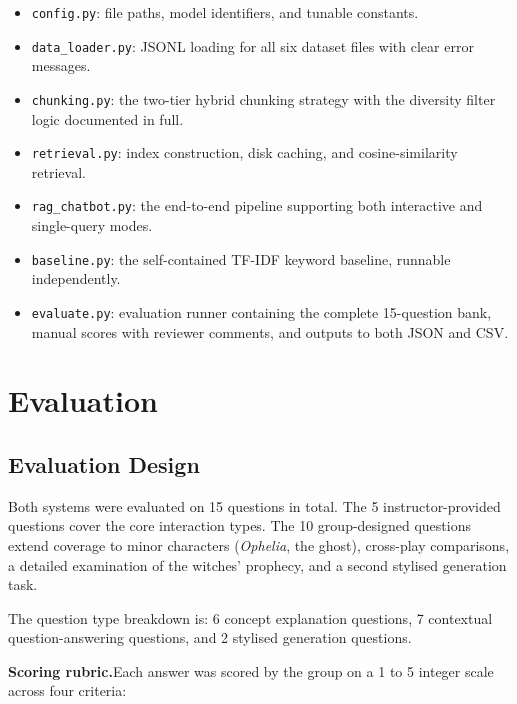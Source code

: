 \documentclass[10pt,conference]{IEEEtran}
\begin{document}
\begin{itemize}
  \item \texttt{config.py}: file paths, model identifiers, and
        tunable constants.
  \item \texttt{data\_loader.py}: JSONL loading for all six dataset
        files with clear error messages.
  \item \texttt{chunking.py}: the two-tier hybrid chunking strategy
        with the diversity filter logic documented in full.
  \item \texttt{retrieval.py}: index construction, disk caching, and
        cosine-similarity retrieval.
  \item \texttt{rag\_chatbot.py}: the end-to-end pipeline supporting
        both interactive and single-query modes.
  \item \texttt{baseline.py}: the self-contained TF-IDF keyword
        baseline, runnable independently.
  \item \texttt{evaluate.py}: evaluation runner containing the
        complete 15-question bank, manual scores with reviewer
        comments, and outputs to both JSON and CSV.
\end{itemize}

\section{Evaluation}
\label{sec:evaluation}

\subsection{Evaluation Design}

Both systems were evaluated on 15 questions in total. The 5
instructor-provided questions cover the core interaction types. The
10 group-designed questions extend coverage to minor characters
(\textit{Ophelia}, the ghost), cross-play comparisons, a detailed
examination of the witches' prophecy, and a second stylised
generation task.

The question type breakdown is: 6 concept explanation questions, 7
contextual question-answering questions, and 2 stylised generation
questions.

\medskip\noindent\textbf{Scoring rubric.}\enspace Each answer was
scored by the group on a 1 to 5 integer scale across four criteria:
\end{document}
